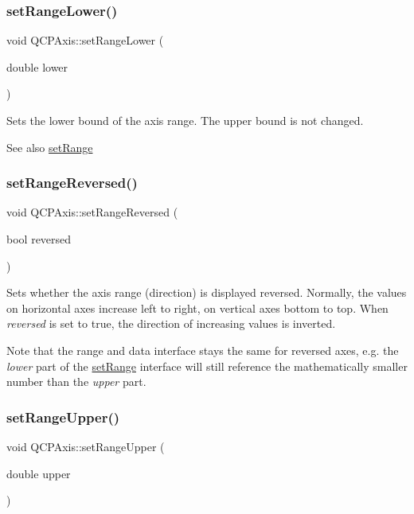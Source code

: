\subsubsection{\texorpdfstring{set\+Range\+Lower()}{setRangeLower()}}
{\footnotesize\ttfamily void Q\+C\+P\+Axis\+::set\+Range\+Lower (\begin{DoxyParamCaption}\item[{double}]{lower }\end{DoxyParamCaption})}

Sets the lower bound of the axis range. The upper bound is not changed. \begin{DoxySeeAlso}{See also}
\mbox{\hyperlink{class_q_c_p_axis_aebdfea5d44c3a0ad2b4700cd4d25b641}{set\+Range}} 
\end{DoxySeeAlso}
\mbox{\label{class_q_c_p_axis_a2172fdb196b1a0dc3f40992fcad8e9e1}} 
\subsubsection{\texorpdfstring{set\+Range\+Reversed()}{setRangeReversed()}}
{\footnotesize\ttfamily void Q\+C\+P\+Axis\+::set\+Range\+Reversed (\begin{DoxyParamCaption}\item[{bool}]{reversed }\end{DoxyParamCaption})}

Sets whether the axis range (direction) is displayed reversed. Normally, the values on horizontal axes increase left to right, on vertical axes bottom to top. When {\itshape reversed} is set to true, the direction of increasing values is inverted.

Note that the range and data interface stays the same for reversed axes, e.\+g. the {\itshape lower} part of the \mbox{\hyperlink{class_q_c_p_axis_aebdfea5d44c3a0ad2b4700cd4d25b641}{set\+Range}} interface will still reference the mathematically smaller number than the {\itshape upper} part. \mbox{\label{class_q_c_p_axis_acd3ca1247aa867b540cd5ec30ccd3bef}} 
\subsubsection{\texorpdfstring{set\+Range\+Upper()}{setRangeUpper()}}
{\footnotesize\ttfamily void Q\+C\+P\+Axis\+::set\+Range\+Upper (\begin{DoxyParamCaption}\item[{double}]{upper }\end{DoxyParamCaption})}

